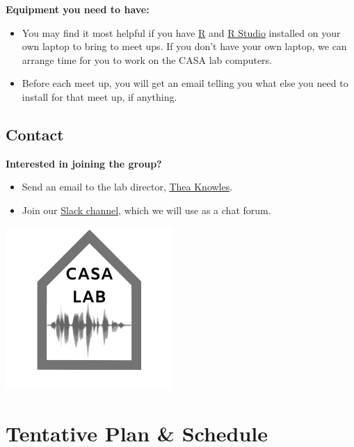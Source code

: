 \documentclass[
]{book}
\providecommand{\tightlist}{%
  \setlength{\itemsep}{0pt}\setlength{\parskip}{0pt}}
\begin{document}
\textbf{Equipment you need to have:}

\begin{itemize}
\tightlist
\item
  You may find it most helpful if you have \href{https://www.r-project.org/}{R} and \href{https://rstudio.com/}{R Studio} installed on your own laptop to bring to meet ups. If you don't have your own laptop, we can arrange time for you to work on the CASA lab computers.
\item
  Before each meet up, you will get an email telling you what else you need to install for that meet up, if anything.
\end{itemize}

\hypertarget{contact}{%
\section*{Contact}\label{contact}}

\textbf{Interested in joining the group?}

\begin{itemize}
\tightlist
\item
  Send an email to the lab director, \href{mailto:theaknow@buffalo.edu}{Thea Knowles}.
\item
  Join our \href{https://join.slack.com/t/casa-lab-ub/shared_invite/enQtOTEyMDk1MzkxMjgzLWU3ZGVhYWViOWU1YjJkZjA0OGEzZGNkMTdhNjM4ZWM5N2FlMDEwOWI3MzE3MWQ4YzM1MmMzYmFiYWIxZGI2NTg}{Slack channel}, which we will use as a chat forum.
\end{itemize}

\href{https://casa-lab.netlify.com}{\includegraphics{img/casa-lab-logo.png}}

\hypertarget{intro}{%
\chapter{Tentative Plan \& Schedule}\label{intro}}
\end{document}

